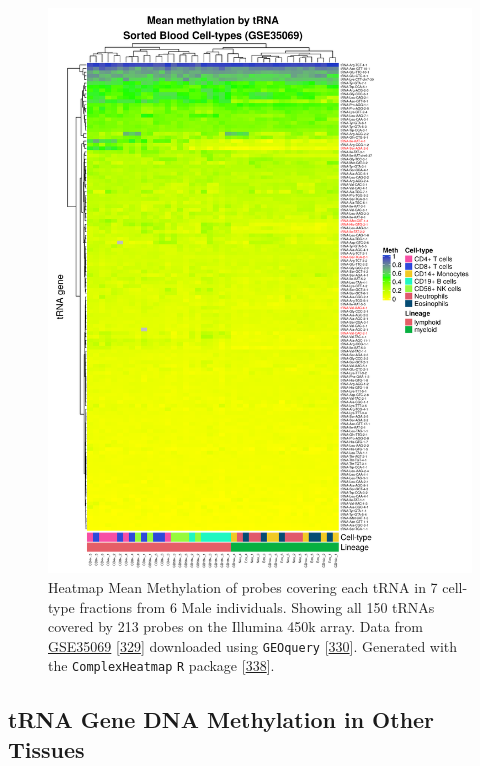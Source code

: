 \documentclass[
]{book}
\begin{document}
\begin{figure}

{\centering \includegraphics[width=0.9\linewidth]{./figs/meanMethbytRNAMatHeatmapLow_bl} 

}

\caption{Heatmap Mean Methylation of probes covering each tRNA in 7 cell-type fractions from 6 Male individuals. Showing all 150 tRNAs covered by 213 probes on the Illumina 450k array. Data from \href{https://www.ncbi.nlm.nih.gov/geo/query/acc.cgi?acc=GSE35069}{GSE35069} {[}\protect\hyperlink{ref-Reinius2012}{329}{]} downloaded using \texttt{GEOquery} {[}\protect\hyperlink{ref-Davis2007p}{330}{]}. Generated with the \texttt{ComplexHeatmap} \texttt{R} package {[}\protect\hyperlink{ref-Gu2016}{338}{]}.}\label{fig:meanMethbytRNAMatHeatmapLow}
\end{figure}



\hypertarget{trna-gene-dna-methylation-in-other-tissues}{%
\subsection{tRNA Gene DNA Methylation in Other Tissues}\label{trna-gene-dna-methylation-in-other-tissues}}
\end{document}
